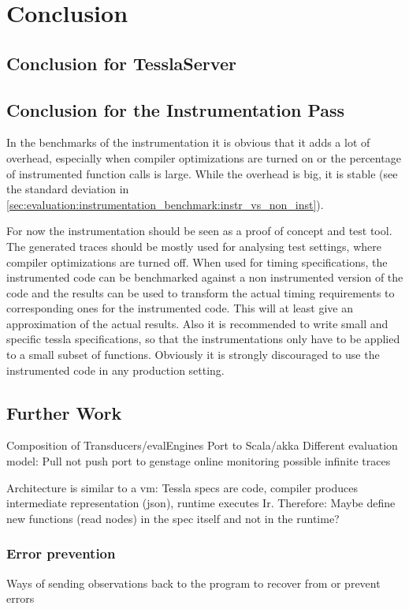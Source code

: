 %
\chapter{Conclusion}
\label{sec:conclusion}

\section{Conclusion for TesslaServer}

\section{Conclusion for the Instrumentation Pass}

In the benchmarks of the instrumentation it is obvious that it adds a lot of overhead, especially when compiler optimizations are turned on or the percentage of instrumented function calls is large.
While the overhead is big, it is stable (see the standard deviation in \cref{sec:evaluation:instrumentation_benchmark:instr_vs_non_inst}).

For now the instrumentation should be seen as a proof of concept and test tool.
The generated traces should be mostly used for analysing test settings, where compiler optimizations are turned off.
When used for timing specifications, the instrumented code can be benchmarked against a non instrumented version of the code and the results can be used to transform the actual timing requirements to corresponding ones for the instrumented code.
This will at least give an approximation of the actual results.
Also it is recommended to write small and specific \gls{tessla} specifications, so that the instrumentations only have to be applied to a small subset of functions.
Obviously it is strongly discouraged to use the instrumented code in any production setting.

\section{Further Work}
\label{sec:conclusion:further_work}

Composition of Transducers/evalEngines
Port to Scala/akka
Different evaluation model: Pull not push
port to genstage
online monitoring
possible infinite traces

Architecture is similar to a vm: Tessla specs are code, compiler produces intermediate representation (json), runtime executes Ir.
Therefore: Maybe define new functions (read nodes) in the spec itself and not in the runtime?

\subsection{Error prevention}
\label{sec:conclusion:further_work:error_prevention}
Ways of sending observations back to the program to recover from or prevent errors


